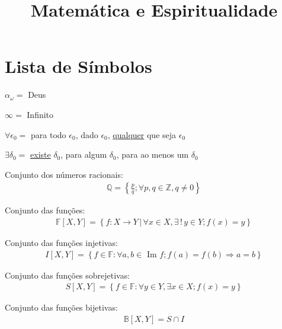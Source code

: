 \documentclass[12pt,a4paper]{article}
\title{Matem\'atica e Espiritualidade}
\date{}
\begin{document}
	\maketitle

	\tableofcontents
	\addtocontents{}{\protect\rule{\textwidth}{.2pt}\par}

	\section{Lista de S\'imbolos}\label{simbolos}
		\begin{flushright}
		\end{flushright}

		$ \alpha_\omega = $ Deus

		$ \infty = $ Infinito

		$ \forall \epsilon_0 = $ para todo $ \epsilon_0 $, dado $ \epsilon_0 $, \href{http://en.wikipedia.org/wiki/Universal\_quantification}{qualquer} que seja $ \epsilon_0 $

		$ \exists \delta_0 = $ \href{http://en.wikipedia.org/wiki/Existential\_quantifier}{existe} $ \delta_0 $, para algum $ \delta_0 $, para ao menos um $ \delta_0 $

		Conjunto dos n\'umeros racionais:
		\begin{align*}
			\mathbb{Q} = \left\{\frac{p}{q} ; \forall p,q \in \mathbb{Z}, q \neq 0\right\}
		\end{align*}

		Conjunto das fun\c{c}\~oes:
		\begin{align*}
			\mathbb{F}[X,Y] = \left\{f: X \rightarrow Y \, | \, \forall x \in X, \exists \, ! \, y \in Y ; f(x) = y \right\}
		\end{align*}

		Conjunto das fun\c{c}\~oes injetivas:
		\begin{align*}
			I[X,Y] = \left\{f \in \mathbb{F} : \forall a, b \in \mbox{ Im }f ; f(a) = f(b) \Rightarrow a = b \right\}
		\end{align*}

		Conjunto das fun\c{c}\~oes sobrejetivas:
		\begin{align*}
			S[X,Y] = \left\{f \in \mathbb{F} : \forall y \in Y, \exists x \in X ; f(x) = y \right\}
		\end{align*}

		Conjunto das fun\c{c}\~oes bijetivas:
		\begin{align*}
			\mathbb{B}[X,Y] = S \cap I
		\end{align*}
\end{document}
